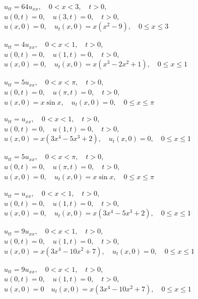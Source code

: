 \begin{exerciselist}
\item\label{exer:12.2.8}\Cex
$u_{tt}=64u_{xx},\quad 0<x<3,\quad t>0$,\\
  $u(0,t)=0,\quad u(3,t)=0,\quad t>0$,\\
$u(x,0)=0,\quad u_t(x,0)=x(x^2-9),\quad0\le x\le 3$


\item\label{exer:12.2.9}$u_{tt}=4u_{xx},\quad 0<x<1,\quad t>0$,\\
$u(0,t)=0,\quad u(1,t)=0,\quad t>0$,\\
$u(x,0)=0,\quad u_t(x,0)=x(x^3-2x^2+1),\quad0\le x\le1$




\item\label{exer:12.2.10}$u_{tt}=5u_{xx},\quad 0<x<\pi,\quad t>0$,\\
$u(0,t)=0,\quad u(\pi,t)=0,\quad t>0$,\\
$u(x,0)=x\sin x,\quad u_t(x,0)=0,\quad0\le x\le \pi$


\item\label{exer:12.2.11}$u_{tt}=u_{xx},\quad 0<x<1,\quad t>0$,\\
$u(0,t)=0,\quad u(1,t)=0,\quad t>0$,\\
$u(x,0)=x(3x^4-5x^3+2),\quad u_t(x,0)=0,\quad0\le x\le1$


\item\label{exer:12.2.12}\Cex
$u_{tt}=5u_{xx},\quad 0<x<\pi,\quad t>0$,\\
$u(0,t)=0,\quad u(\pi,t)=0,\quad t>0$,\\
$u(x,0)=0,\quad u_t(x,0)=x\sin x,\quad0\le x\le \pi$


\item\label{exer:12.2.13}$u_{tt}=u_{xx},\quad 0<x<1,\quad t>0$,\\
$u(0,t)=0,\quad u(1,t)=0,\quad t>0$,\\
$u(x,0)=0,\quad u_t(x,0)=x(3x^4-5x^3+2),\quad0\le x\le1$




\item\label{exer:12.2.14}$u_{tt}=9u_{xx},\quad 0<x<1,\quad t>0$,\\
$u(0,t)=0,\quad u(1,t)=0,\quad t>0$,\\
$u(x,0)=x(3x^4-10x^2+7),\quad u_t(x,0)=0,\quad0\le x\le1$


\item\label{exer:12.2.15}\Cex
$u_{tt}=9u_{xx},\quad 0<x<1,\quad t>0$,\\
$u(0,t)=0,\quad u(1,t)=0,\quad t>0$,\\
$u(x,0)=0\quad u_t(x,0)=x(3x^4-10x^2+7),\quad0\le x\le1$






\end{exerciselist}
